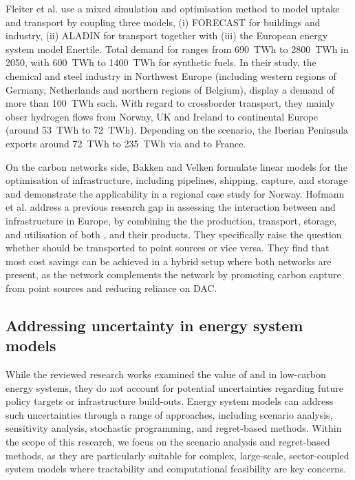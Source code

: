 \documentclass[final,5p,times,twocolumn,sort&compress]{elsarticle}
\begin{document}
Fleiter et al. \cite{fleiterHydrogenInfrastructureFuture2025} use a mixed simulation and optimisation method to model  uptake and transport by coupling three models, (i) FORECAST for buildings and industry, (ii) ALADIN for transport together with (iii) the European energy system model Enertile. Total demand for  ranges from \SI{690}{TWh} to \SI{2800}{TWh} in 2050, with \SI{600}{TWh} to \SI{1400}{TWh} for synthetic fuels. In their study, the  chemical and steel industry in Northwest Europe (including western regions of Germany, Netherlands and northern regions of Belgium), display a demand of more than \SI{100}{TWh} each. With regard to crossborder transport, they mainly obser hydrogen flows from Norway, UK and Ireland to continental Europe (around \SI{53}{TWh} to \SI{72}{TWh}). Depending on the scenario, the Iberian Peninsula exports around \SI{72}{TWh} to \SI{235}{TWh} via and to France.

On the carbon networks side, Bakken and Velken \cite{bakkenLinearModelsOptimization2008} formulate linear models for the optimisation of  infrastructure, including pipelines, shipping,  capture, and storage and demonstrate the applicability in a regional case study for Norway.
Hofmann et al. \cite{hofmannH2CO2Network2025} address a previous research gap in assessing the interaction between  and  infrastructure in Europe, by combining the the production, transport, storage, and utilisation of both ,  and their products. They specifically raise the question whether  should be transported to  point sources or vice versa. They find that most cost savings can be achieved in a hybrid setup where both networks are present, as the  network complements the  network by promoting carbon capture from point sources and reducing reliance on DAC.
 
\subsection{Addressing uncertainty in energy system models}
While the reviewed research works examined the value of  and  in low-carbon energy systems, they do not account for potential uncertainties regarding future policy targets or infrastructure build-outs. 
Energy system models can address such uncertainties through a range of approaches, including scenario analysis, sensitivity analysis, stochastic programming, and regret-based methods. Within the scope of this research, we focus on the scenario analysis and regret-based methods, as they are particularly suitable for complex, large-scale, sector-coupled system models where tractability and computational feasibility are key concerns.
\end{document}
